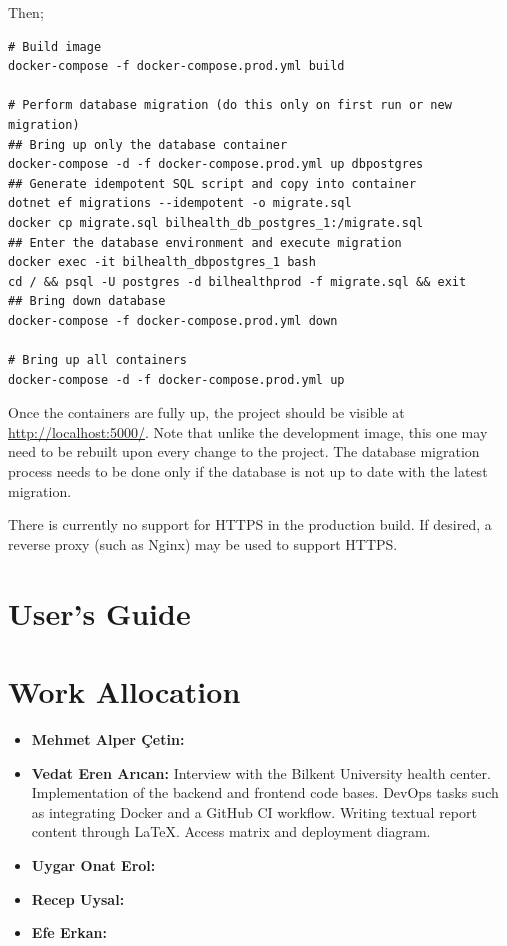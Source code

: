 \documentclass[a4paper, 12pt, titlepage]{article}
\begin{document}
  Then;
  
  \begin{verbatim}
# Build image
docker-compose -f docker-compose.prod.yml build

# Perform database migration (do this only on first run or new migration)
## Bring up only the database container
docker-compose -d -f docker-compose.prod.yml up dbpostgres
## Generate idempotent SQL script and copy into container
dotnet ef migrations --idempotent -o migrate.sql
docker cp migrate.sql bilhealth_db_postgres_1:/migrate.sql
## Enter the database environment and execute migration
docker exec -it bilhealth_dbpostgres_1 bash
cd / && psql -U postgres -d bilhealthprod -f migrate.sql && exit
## Bring down database
docker-compose -f docker-compose.prod.yml down

# Bring up all containers
docker-compose -d -f docker-compose.prod.yml up
  \end{verbatim}
  
  Once the containers are fully up, the project should be visible at \url{http://localhost:5000/}.
  Note that unlike the development image, this one may need to be rebuilt upon every change to the project.
  The database migration process needs to be done only if the database is not up to date with the latest migration.
  
  There is currently no support for HTTPS in the production build.
  If desired, a reverse proxy (such as Nginx) may be used to support HTTPS.
  
  \pagebreak
  \section{User's Guide}

  
  
  \pagebreak
  \section{Work Allocation}
  
  \begin{itemize}
    \item \textbf{Mehmet Alper Çetin:}
    \item \textbf{Vedat Eren Arıcan:}
      Interview with the Bilkent University health center.
      Implementation of the backend and frontend code bases.
      DevOps tasks such as integrating Docker and a GitHub CI workflow.
      Writing textual report content through \LaTeX{}. Access matrix and deployment diagram.
    \item \textbf{Uygar Onat Erol:}
    \item \textbf{Recep Uysal:}
    \item \textbf{Efe Erkan:}
  \end{itemize}
\end{document}
